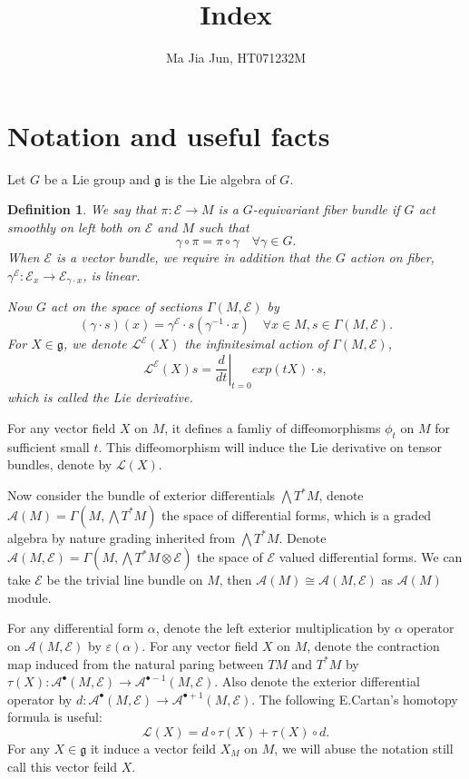 \documentclass[11pt]{amsart}
\title{Index}
\author{Ma Jia Jun, HT071232M}
\newtheorem{Def}[Thm]{Definition}
\def\cA{{\mathcal{A}}}
\def\cL{{\mathcal{L}}}
\def\cE{{\mathcal{E}}}
\def\fgg{{\mathfrak{g}}}
\begin{document}
\maketitle


\section{Notation and useful facts}
Let $G$ be a Lie group and $\fgg$ is the Lie algebra of $G$.
\begin{Def}
We say that $\pi:\cE\to M$ is a  $G$-equivariant fiber bundle if $G$ act smoothly on left both on $\cE$ and $M$ such that 
\[
\gamma \circ \pi = \pi \circ \gamma \quad \forall \gamma\in G.
\]
When $\cE$ is a vector bundle, we require in addition that the $G$
action on fiber, $\gamma^\cE:\cE_x \to \cE_{\gamma\cdot x}$,  is linear.

Now $G$ act on the space of sections $\Gamma(M,\cE)$ by 
\[
(\gamma\cdot s)(x) = \gamma^\cE\cdot s(\gamma^{-1}\cdot x) \quad
\forall x\in M, s\in \Gamma(M,\cE). 
\]
For $X \in \fgg$, we denote $\cL^\cE(X)$ the infinitesimal action of
$\Gamma(M,\cE)$, 
\[
\cL^\cE(X) s =\left.\frac{d}{dt}\right|_{t=0} exp(tX)\cdot s,
\]
which is called the Lie derivative.
\end{Def}
For any vector field $X$ on $M$, it defines a famliy of diffeomorphisms $\phi_t$
on $M$ for sufficient small $t$. This diffeomorphism will induce the
Lie derivative on tensor bundles, denote by $\cL(X)$. 

Now consider the bundle of exterior differentials $\bigwedge
T^*M$, denote $\cA(M)=\Gamma(M,\bigwedge T^*M)$  the space of
differential forms, which is a graded algebra by nature grading
inherited from $\bigwedge T^*M$.
Denote $\cA(M,\cE)=\Gamma(M,\bigwedge T^*M\otimes \cE)$  the space
of $\cE$ valued differential forms. We can take $\cE$ be the trivial
line bundle on $M$, then $\cA(M) \cong \cA(M,\cE)$ as $\cA(M)$ module.  

For any differential form $\alpha$, denote the
left exterior multiplication  by $\alpha$ operator on $\cA(M, \cE)$ by
$\varepsilon(\alpha)$.
For any vector field $X$ on $M$, denote the contraction map induced
from the natural paring between $TM$ and $T^*M$ by 
$\tau(X):\cA^\bullet(M,\cE)\to
\cA^{\bullet-1}(M,\cE)$. Also denote the exterior differential
operator by $d:\cA^\bullet(M,\cE) \to \cA^{\bullet+1}(M,\cE)$. The
  following E.Cartan's homotopy formula is useful:
\[
\cL(X) = d\circ \tau(X) + \tau(X)\circ d.
\]
For any $X\in \fgg$ it induce a vector feild $X_M$ on $M$, we will
abuse the notation still call this vector feild $X$.
\end{document}
